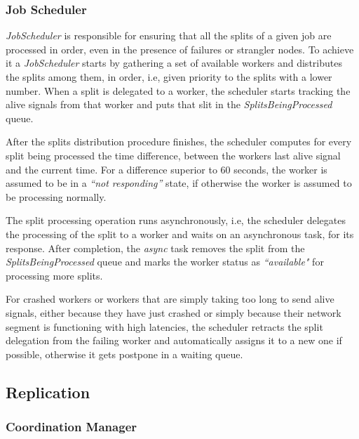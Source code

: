 \documentclass[times, 10pt,twocolumn]{article}
\begin{document}
        	\subsubsection{Job Scheduler}\label{job-scheduler}
            
            \textit{JobScheduler} is responsible for ensuring that all the splits of a given job are processed in order, even in the presence of failures or strangler nodes. To achieve it a \textit{JobScheduler} starts by gathering a set of available workers and distributes the splits among them, in order, i.e, given priority to the splits with a lower number. When a split is delegated to a worker, the scheduler starts tracking the alive signals from that worker and puts that slit in the \textit{SplitsBeingProcessed} queue.
            
            After the splits distribution procedure finishes, the scheduler computes for every split being processed the time difference, between the workers last alive signal and the current time. For a difference superior to 60 seconds, the worker is assumed to be in a \textit{``not responding''} state, if otherwise the worker is assumed to be processing normally.
            
            The split processing operation runs asynchronously, i.e, the scheduler delegates the processing of the split to a worker and waits on an asynchronous task, for its response. After completion, the \textit{async} task removes the split from the \textit{SplitsBeingProcessed} queue and marks the worker status as \textit{``available"} for processing more splits.
            
            For crashed workers or workers that are simply taking too long to send alive signals, either because they have just crashed or simply because their network segment is functioning with high latencies, the scheduler retracts the split delegation from the failing worker and automatically assigns it to a new one if possible, otherwise it gets postpone in a waiting queue.
            
        \subsection{Replication}
        
        	\subsubsection{Coordination Manager}
        	
\end{document}
